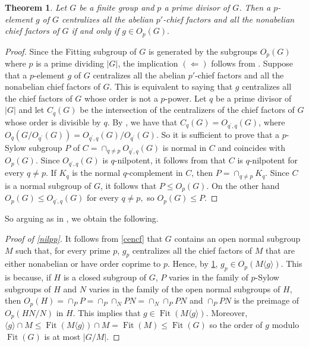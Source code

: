 \documentclass{amsart}
\DeclareMathOperator{\nil}{\mathcal N}
\DeclareMathOperator{\fit}{Fit}
\newtheorem{thm}{Theorem}
\numberwithin{equation}{section}
\begin{document}
\begin{thm}\label{thm_dh} Let $G$ be a finite group and $p$ a prime divisor of $G$. Then a $p$-element $g$ of $G$ centralizes all the abelian $p'$-chief factors and all the nonabelian chief factors of $G$ if and only if $g \in O_p(G).$
\end{thm}
\begin{proof}
Since the Fitting subgroup of $G$ is generated by the subgroups $O_p(G)$ where $p$ is a prime dividing $|G|$, the implication $(\Leftarrow)$ follows from \cite[Theorem 13.8(b)]{dh}. Suppose that a $p$-element $g$ of $G$ centralizes all the abelian $p'$-chief factors and all the nonabelian chief factors of $G$. This is equivalent to saying that $g$ centralizes all the chief factors of $G$ whose order is not a $p$-power.
	Let $q$ be a prime divisor of $|G|$ and let $C_q(G)$ be the intersection of the centralizers of the chief factors of $G$ whose order is divisible by $q
	.$ By \cite[Theorem 13.8(a)]{dh}, we have that $C_q(G)=O_{q^\prime,q}(G)$, where $O_q(G/O_{q^\prime}(G)) = O_{q^\prime,q}(G)/O_{q^\prime}(G)$. So it is sufficient to prove that a $p$-Sylow subgroup $P$ of $C=\cap_{q\neq p}O_{q^\prime,q}(G)$ is normal in $C$ and coincides with $O_p(G).$
	Since $O_{q^\prime,q}(G)$ is $q$-nilpotent, it follows from \cite[Theorem 13.4(a)]{dh}
	that $C$ is $q$-nilpotent for every $q\neq p.$ If $K_q$ is the normal $q$-complement in $C$, then $P=\cap_{q\neq p}K_q$.  Since $C$ is a normal subgroup of $G$, it follows that $P\leq O_p(G).$ On the other hand $O_p(G)\leq O_{q^\prime,q}(G)$ for every $q\neq p,$ so $O_p(G)\leq P.$
\end{proof}

So arguing as in \cite[Theorem 27]{pel}, we obtain the following.

\begin{proof}[Proof of \cref{nilpp}]
It follows from \cref{cencf} that $G$ contains an open normal subgroup $M$ such that, for every prime $p$, $g_p$  centralizes all the chief factors of $M$ that are either nonabelian or have order coprime to $p.$ Hence, by \cref{thm_dh}, $g_p\in O_p(M\langle g\rangle)$. This is because, if $H$ is a closed subgroup of $G$, $P$ varies in the family of $p$-Sylow subgroups of $H$ and $N$ varies in the family of the open normal subgroups of $H$, then $O_p(H) = \cap_P P = \cap_P \cap_N PN = \cap_N \cap_P PN$ and $\cap_P PN$ is the preimage of $O_p(HN/N)$ in $H$. This implies that $g\in \fit(M\langle g\rangle).$
Moreover, $\langle g\rangle \cap M\leq \fit(M \langle g \rangle) \cap M = \fit(M)\leq \fit(G)$ so the order of $g$ modulo $\fit(G)$ is at most $|G/M|.$    
\end{proof}
\end{document}
